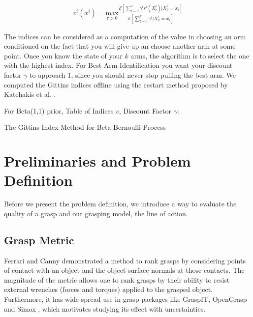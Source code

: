\documentclass[letterpaper, 10 pt, conference]{ieeeconf}  %
\begin{document}
\vspace{-2ex}
\label{eq:git_indices}
\begin{align}
	v^i(x^i) = \underset{\tau>0}{\mbox{max}} \frac{\mathcal{E}[\sum_{t=0}^{\tau}\gamma^tr^i(X_t^i)|X_0^i = x_i]}{\mathcal{E}[\sum_{t=0}^{\tau}\gamma^t|X_0^i = x_i]}
\end{align}


The indices can be considered as a computation of the value in choosing an arm conditioned on the fact that you will give up an choose another arm at some point. Once you know the state of your $k$ arms, the algorithm is to select the one with the highest index.  For Best Arm Identification you want your discount factor $\gamma$ to approach 1, since you should never stop pulling the best arm. We computed the Gittins indices offline using the restart method proposed by Katehakis et al. \cite{katehakis1987multi}.


\begin{algorithm}
 For Beta(1,1) prior, Table of Indices $v$, Discount Factor $\gamma$: \\
 \caption{The Gittins Index Method for Beta-Bernoulli Process}
\end{algorithm}



\section{Preliminaries and Problem Definition}
Before we present the problem definition, we introduce a way to evaluate the quality of a grasp and our grasping model, the line of action.

\subsection{Grasp Metric}
Ferrari and Canny \cite{ferrari1992} demonstrated a method to rank grasps by considering points of contact with an object and the object surface normals at those contacts. The magnitude of the metric allows one to rank grasps by their ability to resist external wrenches (forces and torques) applied to the grasped object. Furthermore, it has wide spread use in grasp packages like GraspIT\cite{miller2004graspit}, OpenGrasp\cite{73} and Simox \cite{vahrenkamp2010simo}, which motivates studying its effect with uncertainties. 
\end{document}
